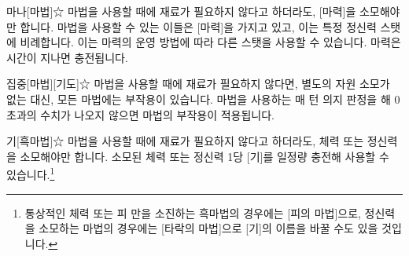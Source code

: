 \documentclass{report}
\begin{document}
	\begin{story}{마나}{[마법]☆}
		마법을 사용할 때에 재료가 필요하지 않다고 하더라도, [마력]을 소모해야만 합니다. 마법을 사용할 수 있는 이들은 [마력]을 가지고 있고, 이는 특정 정신력 스탯에 비례합니다. 이는 마력의 운영 방법에 따라 다른 스탯을 사용할 수 있습니다. 마력은 시간이 지나면 충전됩니다.
	\end{story}

	\begin{story}{집중}{[마법][기도]☆}
		마법을 사용할 때에 재료가 필요하지 않다면, 별도의 자원 소모가 없는 대신, 모든 마법에는 부작용이 있습니다. 마법을 사용하는 매 턴 의지 판정을 해 0 초과의 수치가 나오지 않으면 마법의 부작용이 적용됩니다.
	\end{story}
	
	\begin{story}{기}{[흑마법]☆}
		마법을 사용할 때에 재료가 필요하지 않다고 하더라도, 체력 또는 정신력을 소모해야만 합니다. 소모된 체력 또는 정신력 1당 [기]를 일정량 충전해 사용할 수 있습니다.\footnote{통상적인 체력 또는 피 만을 소진하는 흑마법의 경우에는 [피의 마법]으로, 정신력을 소모하는 마법의 경우에는 [타락의 마법]으로 [기]의 이름을 바꿀 수도 있을 것입니다.}
	\end{story}
\end{document}
